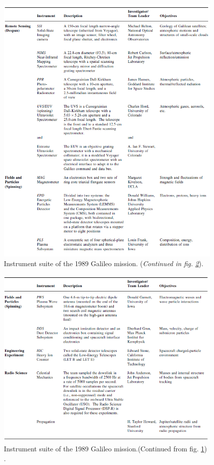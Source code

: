 \begin{figure}[htb]
	\centering
	\includegraphics[width=\textwidth]{figures/Rasmus/GalileoInstrument1}
	\caption{Instrument suite of the 1989 Galileo mission.\cite{SciStrat} (\textit{Continued in fig. \ref{fig:GalInst2}}). \label{fig:GalInst1}}
\end{figure}
\begin{figure}[htb]
	\centering
	\includegraphics[width=\textwidth]{figures/Rasmus/GalileoInstrument2}
	\caption{Instrument suite of the 1989 Galileo mission.(Continued from fig. \ref{fig:GalInst1}) \cite{SciStrat} .\label{fig:GalInst2}}
\end{figure}
